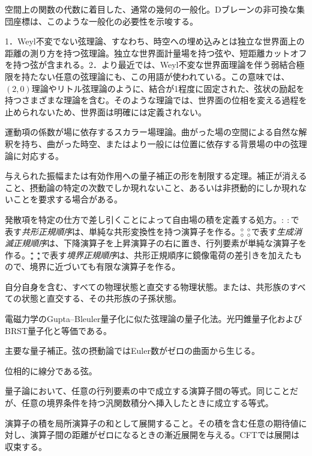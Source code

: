 {空間上の関数の代数に着目した、通常の幾何の一般化。Dブレーンの非可換な集団座標は、このような一般化の必要性を示唆する。}

{1．Weyl不変でない弦理論、すなわち、時空への埋め込みとは独立な世界面上の距離の測り方を持つ弦理論。独立な世界面計量場を持つ弦や、短距離カットオフを持つ弦が含まれる。2．より最近では、Weyl不変な世界面理論を伴う弱結合極限を持たない任意の弦理論にも、この用語が使われている。この意味では、$(2,0)$理論やリトル弦理論のように、結合が1程度に固定された、弦状の励起を持つさまざまな理論を含む。そのような理論では、世界面の位相を変える過程を止められないため、世界面は明確には定義されない。}

{運動項の係数が場に依存するスカラー場理論。曲がった場の空間による自然な解釈を持ち、曲がった時空、またはより一般には位置に依存する背景場の中の弦理論に対応する。}

{与えられた振幅または有効作用への量子補正の形を制限する定理。補正が消えること、摂動論の特定の次数でしか現れないこと、あるいは非摂動的にしか現れないことを要求する場合がある。}

{発散項を特定の仕方で差し引くことによって自由場の積を定義する処方。$:\ :$で表す\emph{共形正規順序}は、単純な共形変換性を持つ演算子を作る。$\canorm{\ }$で表す\emph{生成消滅正規順序}は、下降演算子を上昇演算子の右に置き、行列要素が単純な演算子を作る。$\bndnorm{\ }$で表す\emph{境界正規順序}は、共形正規順序に鏡像電荷の差引きを加えたもので、境界に近づいても有限な演算子を作る。}

{自分自身を含む、すべての物理状態と直交する物理状態。または、共形族のすべての状態と直交する、その共形族の子孫状態。}

{電磁力学のGupta--Bleuler量子化に似た弦理論の量子化法。光円錐量子化およびBRST量子化と等価である。}

{主要な量子補正。弦の摂動論ではEuler数がゼロの曲面から生じる。}

{位相的に線分である弦。}

{量子論において、任意の行列要素の中で成立する演算子間の等式。同じことだが、任意の境界条件を持つ汎関数積分へ挿入したときに成立する等式。}

{演算子の積を局所演算子の和として展開すること。その積を含む任意の期待値に対し、演算子間の距離がゼロになるときの漸近展開を与える。CFTでは展開は収束する。}

